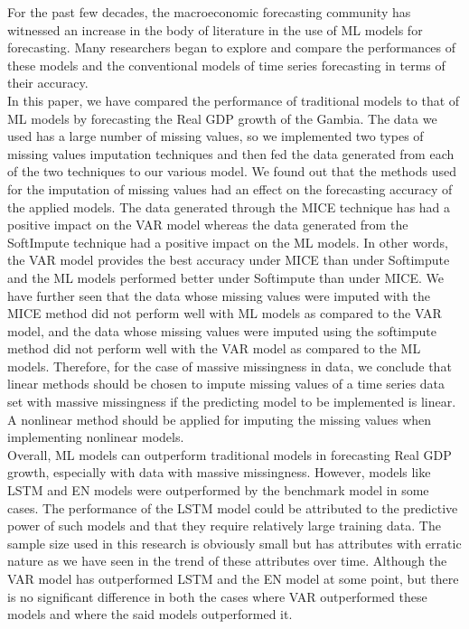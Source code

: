 \documentclass[12pt,italian, twoside]{report}
\begin{document}
For the past few decades, the macroeconomic forecasting community has witnessed an increase in the body of literature in the use of ML models for forecasting. Many researchers began to explore and compare the performances of these models and the conventional models of time series forecasting in terms of their accuracy.
\\
In this paper, we have compared the performance of traditional models to that of ML models by forecasting the Real GDP growth of the Gambia. The data we used has a large number of missing values, so we implemented two types of missing values imputation techniques and then fed the data generated from each of the two techniques to our various model. We found out that the methods used for the imputation of missing values had an effect on the forecasting accuracy of the applied models. The data generated through the MICE technique has had a positive impact on the VAR model whereas the data generated from the SoftImpute technique had a positive impact on the ML models. In other words, the VAR model provides the best accuracy under MICE than under Softimpute and the ML models performed better under Softimpute than under MICE. We have further seen that the data whose missing values were imputed with the MICE method did not perform well with ML models as compared to the VAR model, and the data whose missing values were imputed using the softimpute method did not perform well with the VAR model as compared to the ML models. Therefore, for the case of massive missingness in data, we conclude that linear methods should be chosen to impute missing values of a time series data set with massive missingness if the predicting model to be implemented is linear. A nonlinear method should be applied for imputing the missing values when implementing nonlinear models.
\\
Overall, ML models can outperform traditional models in forecasting Real GDP growth, especially with data with massive missingness. However, models like LSTM and EN models were outperformed by the benchmark model in some cases. The performance of the LSTM model could be attributed to the predictive power of such models and that they require relatively large training data. The sample size used in this research is obviously small but has attributes with erratic nature as we have seen in the trend of these attributes over time. Although the VAR model has outperformed LSTM and the EN model at some point, but there is no significant difference in both the cases where VAR outperformed these models and where the said models outperformed it.
\end{document}
